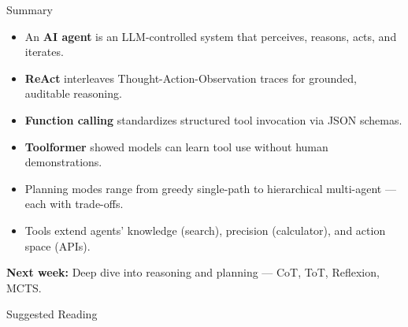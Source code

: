 \documentclass[aspectratio=169,10pt]{beamer}
\begin{document}
\begin{frame}{Summary}
  \begin{itemize}
    \item An \textbf{AI agent} is an LLM-controlled system that perceives, reasons, acts, and iterates.
    \item \textbf{ReAct} interleaves Thought-Action-Observation traces for grounded, auditable reasoning.
    \item \textbf{Function calling} standardizes structured tool invocation via JSON schemas.
    \item \textbf{Toolformer} showed models can learn tool use without human demonstrations.
    \item Planning modes range from greedy single-path to hierarchical multi-agent — each with trade-offs.
    \item Tools extend agents' knowledge (search), precision (calculator), and action space (APIs).
  \end{itemize}
  \vspace{0.3em}
  \textbf{Next week:} Deep dive into reasoning and planning — CoT, ToT, Reflexion, MCTS.
\end{frame}

\begin{frame}[allowframebreaks]{Suggested Reading}
  \nocite{yao2023react, schick2023toolformer, nakano2021webgpt}
  
\end{frame}
\end{document}
